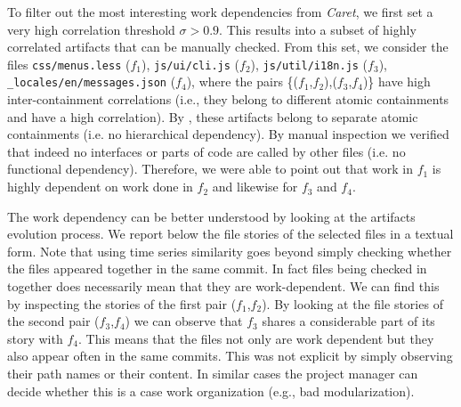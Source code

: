 To filter out the most interesting work dependencies from \emph{Caret}, we first set a very high correlation threshold $\sigma > 0.9$. This results into a subset of highly correlated artifacts that can be manually checked. From this set, we consider the files 
\texttt{css/menus.less} ($f_1$),  \texttt{js/ui/cli.js} ($f_2$), \texttt{js/util/i18n.js} ($f_3$), \texttt{\_locales/en/messages.json} ($f_4$), where the pairs \{($f_1$,$f_2$),($f_3$,$f_4$)\} have high inter-containment correlations (i.e., they belong to different atomic containments and have a high correlation). By , these artifacts belong to separate atomic containments (i.e. no hierarchical dependency). By manual inspection we verified that indeed no interfaces or parts of code are called by other files (i.e. no functional dependency). Therefore, we were able to point out that work in $f_1$ is highly dependent on work done in $f_2$ and likewise for $f_3$ and $f_4$. 

The work dependency can be better understood by looking at the artifacts evolution process. We report below the file stories of the selected files in a textual form. Note that using time series similarity goes beyond simply checking whether the files appeared together in the same commit. In fact files being checked in together does necessarily mean that they are work-dependent. We can find this by inspecting the stories of the first pair ($f_1$,$f_2$). By looking at the file stories of the second pair ($f_3$,$f_4$) we can observe that $f_3$ shares a considerable part of its story with $f_4$. This means that the files not only are work dependent but they also appear often in the same commits. This was not explicit by simply observing their path names or their content. In similar cases the project manager can decide whether this is a case work organization (e.g., bad modularization).

